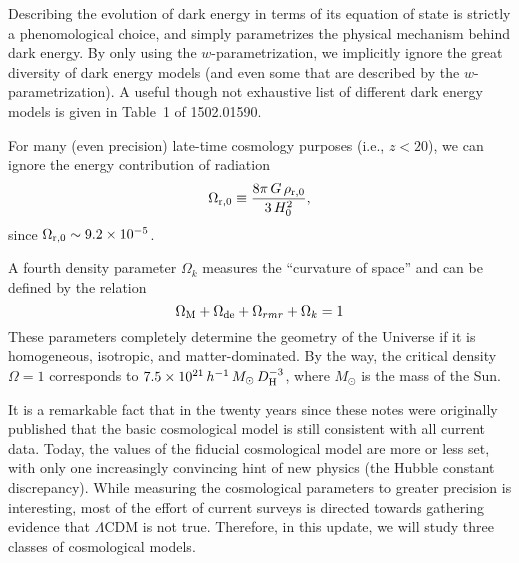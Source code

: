 \documentclass[modern]{aastex62}
\begin{document}
Describing the evolution of dark energy in terms of its equation of state is
strictly a phenomological choice, and simply parametrizes the physical
mechanism behind dark energy. By only using the $w$-parametrization, we
implicitly ignore the great diversity of dark energy models (and even some
that are described by the $w$-parametrization). A useful though not exhaustive
list of different dark energy models is given in Table~1 of 1502.01590.

For many (even precision) late-time cosmology purposes (i.e., $z<20$), we can
ignore the energy contribution of radiation
\begin{equation}
\Omega_{{\rm r}, 0}\equiv\frac{8\pi\,G\,\rho_{{\rm r}, 0}}{3\,H_0^2}\text{,}
\end{equation}
since $\Omega_{{\rm r}, 0} \sim 9.2\times10^{-5}$.

A fourth density parameter $\Omega_k$ measures the ``curvature of space'' and
can be defined by the relation
\begin{equation}
\Omega_{\rm M}+\Omega_{\rm de}+ \Omega_{rm r} + \Omega_k= 1
\end{equation}
These parameters completely determine the geometry of the Universe if it is
homogeneous, isotropic, and matter-dominated.  By the way, the critical
density $\Omega=1$ corresponds to $7.5\times
10^{21}\,h^{-1}\,M_{\odot}\,D_{\rm H}^{-3}$, where $M_{\odot}$ is the mass of
the Sun.

It is a remarkable fact that in the twenty years since these notes were
originally published that the basic cosmological model is still consistent
with all current data. Today, the values of the fiducial cosmological model
are more or less set, with only one increasingly convincing hint of new
physics (the Hubble constant discrepancy). While measuring the cosmological
parameters to greater precision is interesting, most of the effort of current
surveys is directed towards gathering evidence that $\Lambda$CDM is not true.
Therefore, in this update, we will study three classes of cosmological models.
\end{document}
